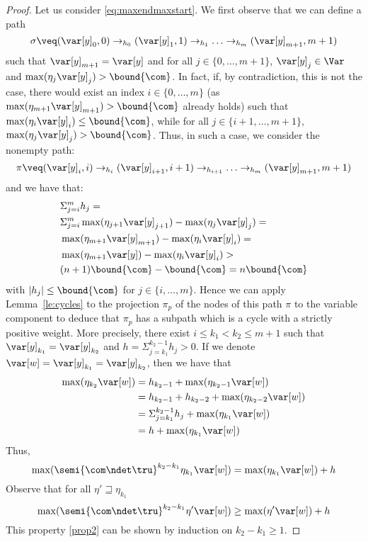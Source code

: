 \begin{proof}
  Let us consider \eqref{eq:maxendmaxstart}. We first observe that we
  can define a path
  \begin{equation}
    \label{eq:fix}
    \sigma \veq (\var[y]_0, 0) \to_{h_0} (\var[y]_1, 1) \to_{h_1}
    \ldots \to_{h_m} (\var[y]_{m+1}, m+1)
  \end{equation}
  such that \(\var[y]_{m+1}=\var[y]\) and for all \(j \in \{0,\ldots, m+1\}\), 
  \(\var[y]_j\in \Var\)  and
  \(\max(\eta_{j} \var[y]_{j}) > \bound{\com}\).
  In fact, if, by contradiction, this is not the case, there would
  exist an index \(i \in \{0,\ldots, m\}\) (as
  \(\max(\eta_{m+1} \var[y]_{m+1}) > \bound{\com}\) already holds)
  such that \(\max(\eta_{i} \var[y]_{i}) \leq \bound{\com}\), while
  for all \(j \in \{i+1,\ldots, m+1\}\),
  \(\max(\eta_{j} \var[y]_j) > \bound{\com}\).  Thus, in such a case,
  we consider the nonempty path:
  \[\pi \veq (\var[y]_i, i) \to_{h_i} (\var[y]_{i+1}, i+1) \to_{h_{i+1}} \ldots
  \to_{h_m} (\var[y]_{m+1}, m+1)\]
  and we have that:
  \begin{align*}
    &\Sigma_{j=i}^m h_j =\\ 
    &\Sigma_{j=i}^m \max(\eta_{j+1} \var[y]_{j+1}) - \max(\eta_j \var[y]_{j}) =\\
    &\max(\eta_{m+1} \var[y]_{m+1}) - \max(\eta_i \var[y]_{i}) =\\
    &\max(\eta_{m+1} \var[y]) - \max(\eta_i \var[y]_{i})>\\
    &  (n+1) \bound{\com} - \bound{\com} = n \bound{\com}
  \end{align*}
  with \(|h_j| \leq \bound{\com}\) for \(j \in \{i,\ldots, m\}\). Hence
  we can apply Lemma~\ref{le:cycles} to the projection \(\pi_p\) of the nodes
  of this path \(\pi\) to the variable
  component 
  to deduce that \(\pi_p\) has a subpath which is a cycle with a strictly positive weight. 
  More precisely, there
  exist \(i \leq k_1 < k_2 \leq m+1\) such that
  \(\var[y]_{k_1} = \var[y]_{k_2}\) and
  \(h = \Sigma_{j=k_1}^{k_2-1} h_j > 0\). If we denote 
  \(\var[w] = \var[y]_{k_1} = \var[y]_{k_2}\), then we
  have  that   
  \begin{align*}
    \max(\eta_{k_2} \var[w]) & =  h_{k_2-1}  + \max(\eta_{k_2-1} \var[w]) \\
                             & =  h_{k_2-1} + h_{k_2-2} + \max(\eta_{k_2-2} \var[w])  \\
                             & = \Sigma_{j=k_1}^{k_2-1} h_j + \max(\eta_{k_1} \var[w])  \\
                             & = h +  \max(\eta_{k_1} \var[w])  
  \end{align*}
  Thus,
  \[\max(\semi{\com \ndet \tru}^{k_2-k_1} \eta_{k_1} \var[w]) = \max(\eta_{k_1}
  \var[w]) + h\] 
  Observe that for all \(\eta' \sqsupseteq \eta_{k_1}\)
  \begin{equation}\label{prop2}
    \max(\semi{\com \ndet \tru}^{k_2-k_1} \eta' \var[w]) \geq \max(\eta'
    \var[w]) + h
  \end{equation}
  This property \eqref{prop2} can be shown by induction on \(k_2-k_1 \geq 1\).
  

\end{proof}
